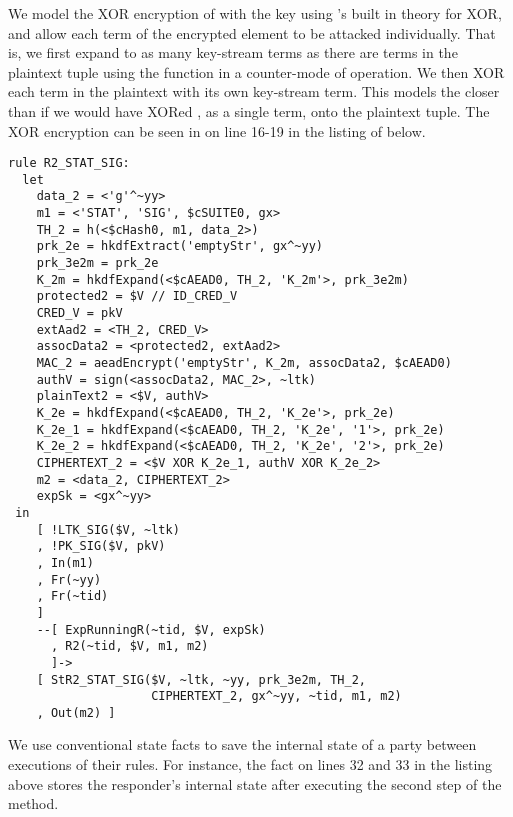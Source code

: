 %
We model the XOR encryption of  with the key  using
\mTamarin{}'s built in theory for XOR, and allow each term of the encrypted
element to be attacked individually.
%
That is, we first expand  to as many key-stream terms as there are
terms in the plaintext tuple using the \mHkdfExpand{} function in a counter-mode
of operation.
%
We then XOR each term in the plaintext with its own key-stream term.
%
This models the \mSpec{} closer than if we would have XORed , as a
single term, onto the plaintext tuple.
%
The XOR encryption can be seen in on line 16-19 in the listing of
 below.
%
\begin{lstlisting}
rule R2_STAT_SIG:
  let
    data_2 = <'g'^~yy>
    m1 = <'STAT', 'SIG', $cSUITE0, gx>
    TH_2 = h(<$cHash0, m1, data_2>)
    prk_2e = hkdfExtract('emptyStr', gx^~yy)
    prk_3e2m = prk_2e
    K_2m = hkdfExpand(<$cAEAD0, TH_2, 'K_2m'>, prk_3e2m)
    protected2 = $V // ID_CRED_V
    CRED_V = pkV
    extAad2 = <TH_2, CRED_V>
    assocData2 = <protected2, extAad2>
    MAC_2 = aeadEncrypt('emptyStr', K_2m, assocData2, $cAEAD0)
    authV = sign(<assocData2, MAC_2>, ~ltk)
    plainText2 = <$V, authV>
    K_2e = hkdfExpand(<$cAEAD0, TH_2, 'K_2e'>, prk_2e)
    K_2e_1 = hkdfExpand(<$cAEAD0, TH_2, 'K_2e', '1'>, prk_2e)
    K_2e_2 = hkdfExpand(<$cAEAD0, TH_2, 'K_2e', '2'>, prk_2e)
    CIPHERTEXT_2 = <$V XOR K_2e_1, authV XOR K_2e_2>
    m2 = <data_2, CIPHERTEXT_2>
    expSk = <gx^~yy>
 in
    [ !LTK_SIG($V, ~ltk)
    , !PK_SIG($V, pkV)
    , In(m1)
    , Fr(~yy)
    , Fr(~tid)
    ]
    --[ ExpRunningR(~tid, $V, expSk)
      , R2(~tid, $V, m1, m2)
      ]->
    [ StR2_STAT_SIG($V, ~ltk, ~yy, prk_3e2m, TH_2,
                    CIPHERTEXT_2, gx^~yy, ~tid, m1, m2)
    , Out(m2) ]
\end{lstlisting}

We use conventional state facts to save the internal state of a party between
executions of their rules.
%
For instance, the fact
 on lines 32 and 33
in the listing above stores the responder's internal state after executing the
second step of the \mStatSig{} method.
%

